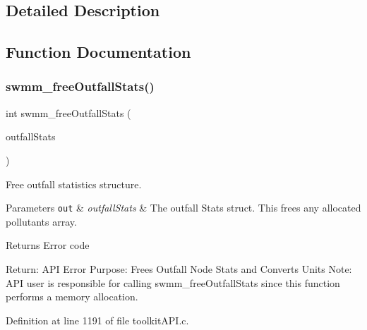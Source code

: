 \subsection{Detailed Description}


\subsection{Function Documentation}
\mbox{\label{group__tkfuncs_ga24874b7dc37c161521f0c14899c2157d}} 
\subsubsection{\texorpdfstring{swmm\+\_\+free\+Outfall\+Stats()}{swmm\_freeOutfallStats()}}
{\footnotesize\ttfamily int swmm\+\_\+free\+Outfall\+Stats (\begin{DoxyParamCaption}\item[{\hyperlink{struct_s_m___outfall_stats}{S\+M\+\_\+\+Outfall\+Stats} $\ast$}]{outfall\+Stats }\end{DoxyParamCaption})}



Free outfall statistics structure. 


\begin{DoxyParams}[1]{Parameters}
\mbox{\tt out}  & {\em outfall\+Stats} & The outfall Stats struct. This frees any allocated pollutants array. \\
\hline
\end{DoxyParams}
\begin{DoxyReturn}{Returns}
Error code
\end{DoxyReturn}
Return\+: A\+PI Error Purpose\+: Frees Outfall Node Stats and Converts Units Note\+: A\+PI user is responsible for calling swmm\+\_\+free\+Outfall\+Stats since this function performs a memory allocation. 

Definition at line 1191 of file toolkit\+A\+P\+I.\+c.

\mbox{\label{group__tkfuncs_ga1035b4f45546c1c90da4dafda7e3677d}} 

